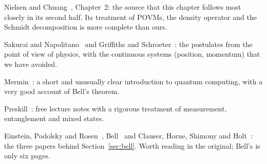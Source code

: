 \begin{furtherreading}
  \item Nielsen and Chuang~\cite{nielsenchuang2010}, Chapter~2: the source that this chapter follows most closely in its second half. Its treatment of POVMs, the density operator and the Schmidt decomposition is more complete than ours.
  \item Sakurai and Napolitano~\cite{sakurai2020} and Griffiths and Schroeter~\cite{griffiths2018}: the postulates from the point of view of physics, with the continuous systems (position, momentum) that we have avoided.
  \item Mermin~\cite{mermin2007}: a short and unusually clear introduction to quantum computing, with a very good account of Bell's theorem.
  \item Preskill~\cite{preskill1998}: free lecture notes with a rigorous treatment of measurement, entanglement and mixed states.
  \item Einstein, Podolsky and Rosen~\cite{epr1935}, Bell~\cite{bell1964} and Clauser, Horne, Shimony and Holt~\cite{chsh1969}: the three papers behind Section~\ref{sec:bell}. Worth reading in the original; Bell's is only six pages.
\end{furtherreading}
